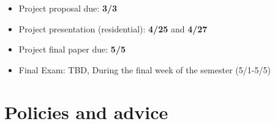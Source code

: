 \documentclass[11pt,article,oneside]{memoir} %
\begin{document}
\vspace{-10pt}
\begin{itemize}\itemsep=0pt%
\item Project proposal due: \textbf{3/3}
\item Project presentation (residential): \textbf{4/25} and \textbf{4/27}
\item Project final paper due: \textbf{5/5}
\item Final Exam: TBD, During the final week of the semester (5/1-5/5)
\end{itemize} %





\section{Policies and advice} %
\end{document}
